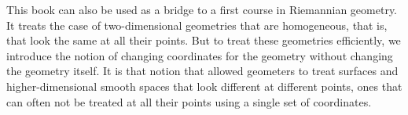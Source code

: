 \documentclass{ximera}
\begin{document}
\begin{remark}
This book can also be used as a bridge to a first course in Riemannian
geometry. It treats the case of two-dimensional geometries that are
homogeneous, that is, that look the same at all their points. But to treat
these geometries efficiently, we introduce the notion of changing coordinates
for the geometry without changing the geometry itself. It is that notion that
allowed geometers to treat surfaces and higher-dimensional smooth spaces that
look different at different points, ones that can often not be treated at all
their points using a single set of coordinates.
\end{remark}
\end{document}
